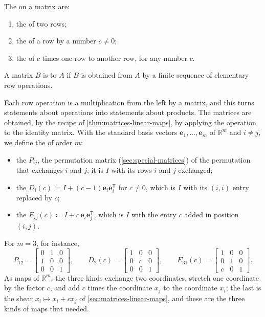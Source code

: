 \begin{definition}
\label{def:row-operations}
The  on a matrix are:
\begin{enumerate}
\item the  of two rows;
\item the  of a row by a number $c\ne0$;
\item the  of $c$ times one row to another row, for any number $c$.
\end{enumerate}
A matrix $B$ is  to $A$ if $B$ is obtained from $A$ by a finite sequence of elementary row operations.
\end{definition}

Each row operation is a multiplication from the left by a matrix, and this turns statements about operations into statements about products. The matrices are obtained, by the recipe of \cref{thm:matrices-linear-maps}, by applying the operation to the identity matrix. With the standard basis vectors $\mathbf e_1,\ldots,\mathbf e_m$ of $\mathbb R^m$ and $i\ne j$, we define the  of order $m$:
\begin{itemize}
\item the  $P_{ij}$, the permutation matrix (\cref{sec:special-matrices}) of the permutation that exchanges $i$ and $j$; it is $I$ with its rows $i$ and $j$ exchanged;
\item the  $D_i(c)\coloneqq I+(c-1)\mathbf e_i\mathbf e_i^{\mathsf T}$ for $c\ne0$, which is $I$ with its $(i,i)$ entry replaced by $c$;
\item the  $E_{ij}(c)\coloneqq I+c\,\mathbf e_i\mathbf e_j^{\mathsf T}$, which is $I$ with the entry $c$ added in position $(i,j)$.
\end{itemize}
For $m=3$, for instance,
\[
P_{12}=\begin{bmatrix}0&1&0\\1&0&0\\0&0&1\end{bmatrix},\qquad D_2(c)=\begin{bmatrix}1&0&0\\0&c&0\\0&0&1\end{bmatrix},\qquad E_{31}(c)=\begin{bmatrix}1&0&0\\0&1&0\\c&0&1\end{bmatrix}.
\]
As maps of $\mathbb R^m$, the three kinds exchange two coordinates, stretch one coordinate by the factor $c$, and add $c$ times the coordinate $x_j$ to the coordinate $x_i$; the last is the shear $x_i\mapsto x_i+cx_j$ of \cref{sec:matrices-linear-maps}, and these are the three kinds of maps that  needed.

